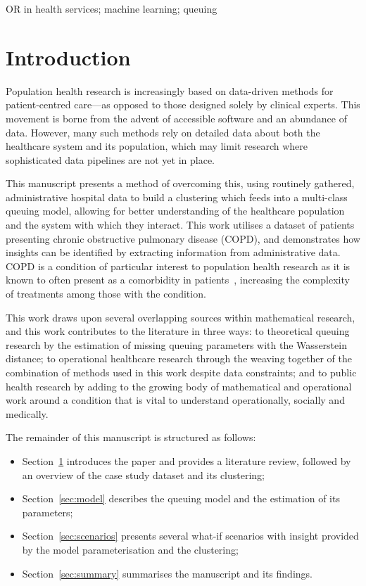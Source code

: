 \documentclass[]{interact}
\theoremstyle{plain}%
\theoremstyle{definition}
\theoremstyle{remark}
\begin{document}
\begin{keywords}
OR in health services; machine learning; queuing
\end{keywords}


\section{Introduction}\label{sec:intro}

Population health research is increasingly based on data-driven methods for
patient-centred care---as opposed to those designed solely by clinical
experts. This movement is borne from the advent of accessible software and an
abundance of data. However, many such methods rely on detailed data about both
the healthcare system and its population, which may limit research where
sophisticated data pipelines are not yet in place.

This manuscript presents a method of overcoming this, using routinely gathered,
administrative hospital data to build a clustering which feeds into a
multi-class queuing model, allowing for better understanding of the healthcare
population and the system with which they interact. This work utilises a dataset
of patients presenting chronic obstructive pulmonary disease (COPD), and
demonstrates how insights can be identified by extracting information from
administrative data. COPD is a condition of particular interest to population
health research as it is known to often present as a comorbidity in
patients~\citep{Houben2019}, increasing the complexity of treatments among those
with the condition.

This work draws upon several overlapping sources within mathematical research,
and this work contributes to the literature in three ways: to theoretical
queuing research by the estimation of missing queuing parameters with the
Wasserstein distance; to operational healthcare research through the weaving
together of the combination of methods used in this work despite data
constraints; and to public health research by adding to the growing body of
mathematical and operational work around a condition that is vital to understand
operationally, socially and medically.

The remainder of this manuscript is structured as follows:

\begin{itemize}
    \item Section~\ref{sec:intro} introduces the paper and provides a literature
        review, followed by an overview of the case study dataset and its
        clustering;
    \item Section~\ref{sec:model} describes the queuing model and the estimation
        of its parameters;
    \item Section~\ref{sec:scenarios} presents several what-if scenarios with
        insight provided by the model parameterisation and the clustering;
    \item Section~\ref{sec:summary} summarises the manuscript and its findings.
\end{itemize}
\end{document}

